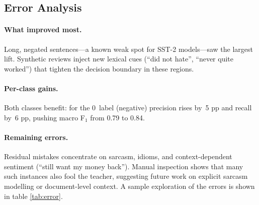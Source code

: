 \documentclass[11pt]{article}
\begin{document}
\subsection{Error Analysis}
\label{sec:error}

\paragraph{What improved most.}
Long, negated sentences---a known weak spot for SST-2 models---saw the
largest lift.  Synthetic reviews inject new lexical cues
(\textquotedblleft did not hate\textquotedblright,
\textquotedblleft never quite worked\textquotedblright) that tighten the
decision boundary in these regions.

\paragraph{Per-class gains.}
Both classes benefit: for the 0~label (negative) precision rises
by~5 pp and recall by~6 pp, pushing macro F$_1$ from 0.79 to 0.84.

\paragraph{Remaining errors.}
Residual mistakes concentrate on sarcasm, idioms, and context-dependent
sentiment (\textquotedblleft still want my money back\textquotedblright).
Manual inspection shows that many such instances also fool the teacher,
suggesting future work on explicit sarcasm modelling or
document-level context. A sample exploration of the errors is shown
in table \ref{tab:error}.
\end{document}
